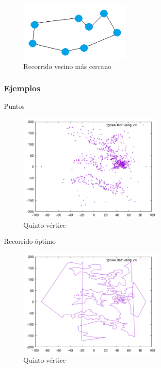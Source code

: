 \begin{frame}
	\begin{exampleblock}{ }
	\begin{figure}[htbH] 
		\centering
		\includegraphics[width=0.5\textwidth]{./Imagenes/arista9.png}
		\caption{Recorrido vecino más cercano} 
	\end{figure}
	\end{exampleblock}
\end{frame}



\subsubsection{Ejemplos}
\begin{frame}
	\begin{exampleblock}{Puntos}
	\begin{figure}[htbH]
		\centering
		\includegraphics[width=0.65\textwidth]{../Viajante/Imagenes/gr666.png}
		\caption{Quinto vértice}
	\end{figure}
	\end{exampleblock}
\end{frame}
	
\begin{frame}
	\begin{exampleblock}{Recorrido óptimo}
	\begin{figure}[htbH]
		\centering
		\includegraphics[width=0.65\textwidth]{../Viajante/Imagenes/gr666_opt.png}
		\caption{Quinto vértice}
	\end{figure}
	\end{exampleblock}
\end{frame}